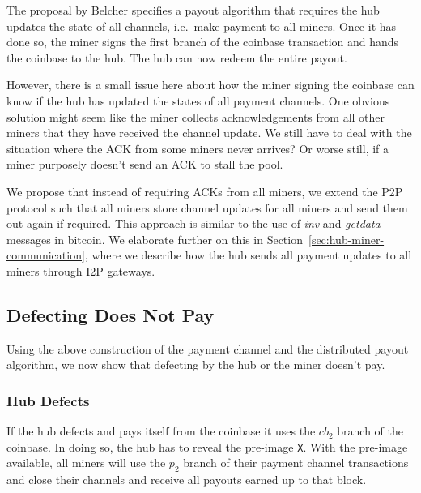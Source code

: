 \documentclass{article}
\begin{document}
The proposal by Belcher specifies a payout algorithm that requires the
hub updates the state of all channels, i.e.\ make payment to all
miners. Once it has done so, the miner signs the first branch of the
coinbase transaction and hands the coinbase to the hub. The hub can now
redeem the entire payout.

However, there is a small issue here about how the miner signing the
coinbase can know if the hub has updated the states of all payment
channels. One obvious solution might seem like the miner collects
acknowledgements from all other miners that they have received the
channel update. We still have to deal with the situation where the ACK
from some miners never arrives? Or worse still, if a miner purposely
doesn't send an ACK to stall the pool.

We propose that instead of requiring ACKs from all miners, we extend
the P2P protocol such that all miners store channel updates for all
miners and send them out again if required. This approach is similar
to the use of \emph{inv} and \emph{getdata} messages in bitcoin. We
elaborate further on this in
Section~\ref{sec:hub-miner-communication}, where we describe how the
hub sends all payment updates to all miners through I2P gateways.




\subsection{Defecting Does Not Pay}\label{ref:defecting}

Using the above construction of the payment channel and the
distributed payout algorithm, we now show that defecting by the hub or
the miner doesn't pay.

\subsubsection{Hub Defects}\label{ref:hub-defects}

If the hub defects and pays itself from the coinbase it uses the
$cb_2$ branch of the coinbase. In doing so, the hub has to reveal the
pre-image \verb|X|. With the pre-image available, all miners will use
the $p_2$ branch of their payment channel transactions and close their
channels and receive all payouts earned up to that block.
\end{document}
